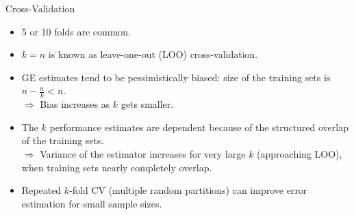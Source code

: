 \documentclass[11pt,compress,t,notes=noshow, xcolor=table]{beamer}
\begin{document}

\begin{vbframe}{Cross-Validation}

\begin{itemize}
  \item 5 or 10 folds are common.%
  \item $k = n$ is known as leave-one-out (LOO) cross-validation.
  \item GE estimates tend to be pessimistically biased: 
  size of the training sets is $ n- \tfrac{n}{k} < n$. \\
  $\Rightarrow$ Bias increases as $k$ gets smaller.
  \item The $k$ performance estimates are dependent because
  of the structured overlap of the training sets.\\
  $\Rightarrow$ Variance of the estimator increases for very large $k$ 
  (approaching LOO), when training sets nearly completely overlap.
  \item Repeated $k$-fold CV (multiple random partitions)
  can improve error estimation for small sample sizes.
\end{itemize}
\end{vbframe}


\end{document}
